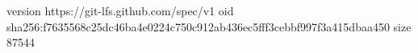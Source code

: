 version https://git-lfs.github.com/spec/v1
oid sha256:f7635568c25dc46ba4e0224c750c912ab436ec5fff3cebbf997f3a415dbaa450
size 87544
